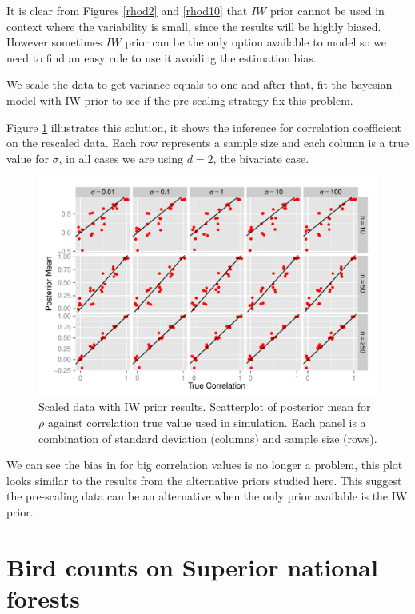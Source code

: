\documentclass{article}
\begin{document}
It is clear from Figures \ref{rhod2} and \ref{rhod10} that $IW$ prior cannot be used in context where the variability is small, since the results will be highly biased. However sometimes $IW$ prior can be the only option available to model so we need to find an easy rule to use it avoiding the estimation bias. 

We scale the data to get variance equals to one and after that, fit the bayesian model with IW prior to see if the pre-scaling strategy fix this problem. 

Figure \ref{sciw} illustrates this solution, it shows the inference for correlation coefficient on the rescaled data. Each row represents a sample size and each column is a true value for $\sigma$, in all cases we are using $d=2$, the bivariate case. 

\begin{figure}[htbp]
   \centering
   \includegraphics[width=\textwidth]{scIW} %
    \vspace{-.5in}
   \caption{Scaled data with IW prior results. Scatterplot of posterior mean for $\rho$  against correlation true value used in simulation. Each panel is a combination of standard deviation (columns) and sample size (rows). \label{sciw} }
\end{figure}

We can see the bias in for big correlation values is no longer a problem, this plot looks similar to the results from the alternative priors studied here. This suggest the pre-scaling data can be an alternative when the only prior available is the IW prior. 


\section{Bird counts on Superior national forests}
\end{document}
